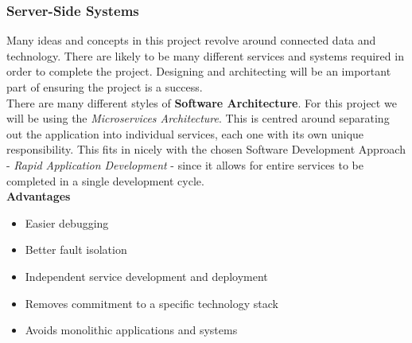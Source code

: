 \subsubsection{Server-Side Systems}
Many ideas and concepts in this project revolve around connected data and technology. There are likely to be many different services and systems required in order to complete the project. Designing and architecting will be an important part of ensuring the project is a success.  \\
There are many different styles of \textbf{Software Architecture}. For this project we will be using the \emph{Microservices Architecture}. This is centred around separating out the application into individual services, each one with its own unique responsibility. This fits in nicely with the chosen Software Development Approach - \emph{Rapid Application Development} - since it allows for entire services to be completed in a single development cycle.\\

    \textbf{Advantages}
    \begin{itemize}
      \item Easier debugging
      \item Better fault isolation
      \item Independent service development and deployment
      \item Removes commitment to a specific technology stack
      \item Avoids monolithic applications and systems
    \end{itemize}

